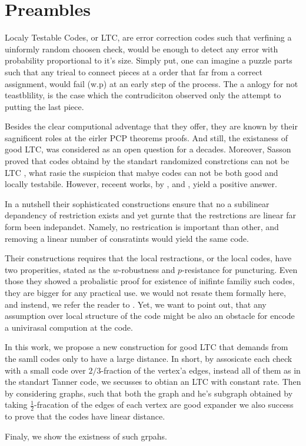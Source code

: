 \section{Preambles}

Localy Testable Codes, or LTC, are error correction codes such that verfining a uinformly random choosen check, would be enough to detect any error with probability proportional to it's size. Simply put, one can imagine a puzzle parts such that any trieal to connect pieces at a order that far from a correct assignment, would fail (w.p) at an early step of the process. The a anlogy for not teastblility, is the case which the contrudiciton observed only the attempt to putting the last piece.     

Besides the clear computional adventage that they offer, they are known by their sagnificent roles at the eirler PCP theorems proofs. And still, the existaness of good LTC, was considered as an open question for a decades. Moreover, Sasson proved that codes obtaind by the standart randomized constrctions can not be LTC \cite{Sasson}, what rasie the suspicion that mabye codes can not be both good and locally testabile. However, receent works, by \cite{Dinur}, \cite{Pavel} and \cite{leverrier2022quantum}, yield a positive answer.

In a nutshell their sophisticated constructions ensure that no a subilinear depandency of restriction exists and yet gurnte that the restrctions are linear far form been indepandet. Namely, no restrication is important than other, and removing a linear number of consratints would yield the same code.  

Their constructions requires that the local restractions, or the local codes, have two properities, stated as the $w$-robustness and $p$-resistance for puncturing. Even those they showed a probalistic proof for existence of inifinte familiy such codes, they are bigger for any practical use. we would not resate them formally here, and instend, we refer the reader to \cite{leverrier2022quantum}. Yet, we want to point out, that any assumption over local structure of the code might be also an obstacle for encode a univirasal compution at the code. 

In this work, we propose a new construction for good LTC that demands from the samll codes only to have a large distance. In short, by assosicate each check with a small code over $2/3$-fraction of the vertex'a edges, instead all of them as in the standart Tanner code, we secusses to obtian an LTC with constant rate. Then by considering graphs, such that both the graph and he's subgraph obtained by taking $\frac{1}{2}$-fracation of the edges of each vertex are good expander we also success to prove that the codes have linear distance. 

Finaly, we show the existness of such grpahs.   
